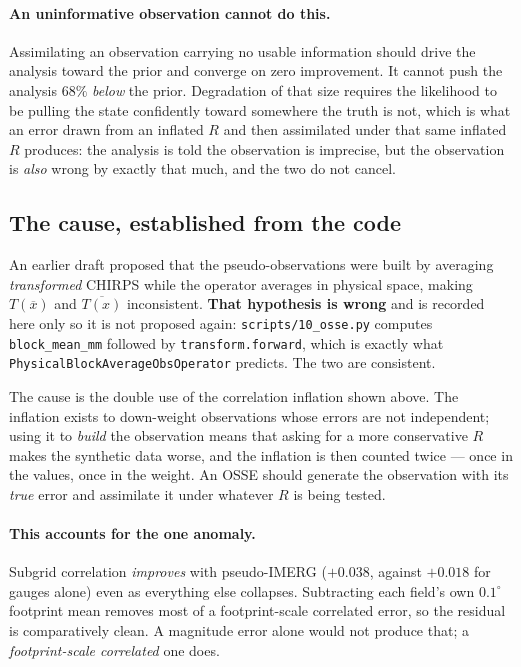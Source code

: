 \paragraph{An uninformative observation cannot do this.}
Assimilating an observation carrying no usable information should drive the
analysis toward the prior and converge on zero improvement. It cannot push the
analysis $68\%$ \emph{below} the prior. Degradation of that size requires the
likelihood to be pulling the state confidently toward somewhere the truth is
not, which is what an error drawn from an inflated $R$ and then assimilated
under that same inflated $R$ produces: the analysis is told the observation is
imprecise, but the observation is \emph{also} wrong by exactly that much, and
the two do not cancel.

\subsection{The cause, established from the code}

An earlier draft proposed that the pseudo-observations were built by averaging
\emph{transformed} CHIRPS while the operator averages in physical space, making
$T(\overline{x})$ and $\overline{T(x)}$ inconsistent. \textbf{That hypothesis is
wrong} and is recorded here only so it is not proposed again:
\texttt{scripts/10\_osse.py} computes \texttt{block\_mean\_mm} followed by
\texttt{transform.forward}, which is exactly what
\texttt{PhysicalBlockAverageObsOperator} predicts. The two are consistent.

The cause is the double use of the correlation inflation shown above. The
inflation exists to down-weight observations whose errors are not independent;
using it to \emph{build} the observation means that asking for a more
conservative $R$ makes the synthetic data worse, and the inflation is then
counted twice --- once in the values, once in the weight. An OSSE should
generate the observation with its \emph{true} error and assimilate it under
whatever $R$ is being tested.

\paragraph{This accounts for the one anomaly.}
Subgrid correlation \emph{improves} with pseudo-IMERG ($+0.038$, against
$+0.018$ for gauges alone) even as everything else collapses. Subtracting each
field's own $0.1^\circ$ footprint mean removes most of a footprint-scale
correlated error, so the residual is comparatively clean. A magnitude error
alone would not produce that; a \emph{footprint-scale correlated} one does.

